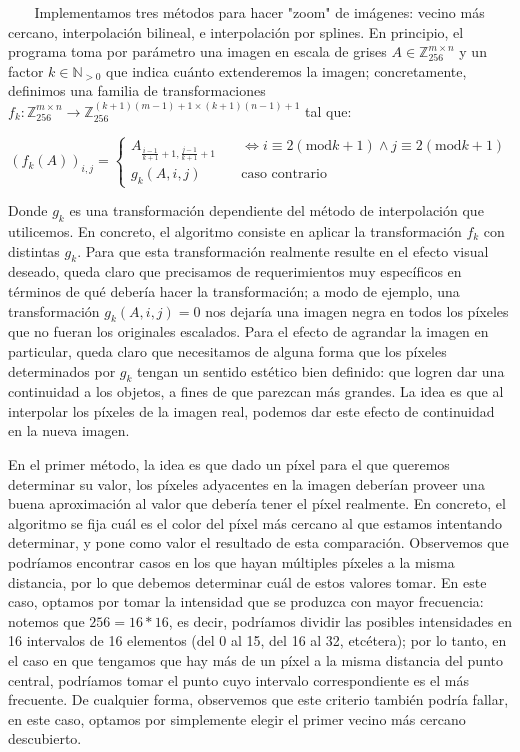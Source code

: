 \documentclass{article}
\begin{document}
$\ $ $\ $ $\ $ $\ $Implementamos tres métodos para hacer "zoom" de imágenes: vecino más cercano, interpolación bilineal, e interpolación por splines. En principio, el programa toma por parámetro una imagen en escala de grises $A \in \mathbb{Z}_{256}^{m \times n}$ y un factor $k \in \mathbb{N}_{>0}$ que indica cuánto extenderemos la imagen; concretamente, definimos una familia de transformaciones $f_k : \mathbb{Z}_{256}^{m \times n} \to \mathbb{Z}_{256}^{(k+1)(m-1)+1 \times (k+1)(n-1)+1}$ tal que:

$$(f_k(A))_{i, j} =
    \begin{cases}
        A_{\frac{i - 1}{k + 1} + 1, \frac{j - 1}{k + 1} + 1} & \quad \iff i \equiv 2 (\text{mod} k+1) \wedge j \equiv 2 (\text{mod} k+1) \\
        g_k(A, i, j) & \quad \text{caso contrario}
    \end{cases}$$

Donde $g_k$ es una transformación dependiente del método de interpolación que utilicemos. En concreto, el algoritmo consiste en aplicar la transformación $f_k$ con distintas $g_k$. Para que esta transformación realmente resulte en el efecto visual deseado, queda claro que precisamos de requerimientos muy específicos en términos de qué debería hacer la transformación; a modo de ejemplo, una transformación $g_k(A, i, j) = 0$ nos dejaría una imagen negra en todos los píxeles que no fueran los originales escalados. Para el efecto de agrandar la imagen en particular, queda claro que necesitamos de alguna forma que los píxeles determinados por $g_k$ tengan un sentido estético bien definido: que logren dar una continuidad a los objetos, a fines de que parezcan más grandes. La idea es que al interpolar los píxeles de la imagen real, podemos dar este efecto de continuidad en la nueva imagen.

En el primer método, la idea es que dado un píxel para el que queremos determinar su valor, los píxeles adyacentes en la imagen deberían proveer una buena aproximación al valor que debería tener el píxel realmente. En concreto, el algoritmo se fija cuál es el color del píxel más cercano al que estamos intentando determinar, y pone como valor el resultado de esta comparación. Observemos que podríamos encontrar casos en los que hayan múltiples píxeles a la misma distancia, por lo que debemos determinar cuál de estos valores tomar. En este caso, optamos por tomar la intensidad que se produzca con mayor frecuencia: notemos que $256 = 16 * 16$, es decir, podríamos dividir las posibles intensidades en 16 intervalos de 16 elementos (del 0 al 15, del 16 al 32, etcétera); por lo tanto, en el caso en que tengamos que hay más de un píxel a la misma distancia del punto central, podríamos tomar el punto cuyo intervalo correspondiente es el más frecuente. De cualquier forma, observemos que este criterio también podría fallar, en este caso, optamos por simplemente elegir el primer vecino más cercano descubierto.
\end{document}
